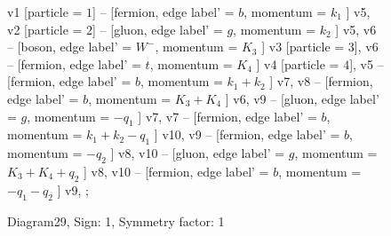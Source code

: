 \documentclass{revtex4}
\begin{document}
\begin{figure}[!htb]
\begin{center}
{    %
v1 [particle = \(1\)] -- [fermion, edge label' = \(b\), momentum = \(k_{1}\) ] v5, 
v2 [particle = \(2\)] -- [gluon, edge label' = \(g\), momentum = \(k_{2}\) ] v5, 
v6 -- [boson, edge label' = \(W^{-}\), momentum = \(K_{3}\) ] v3 [particle = \(3\)], 
v6 -- [fermion, edge label' = \(t\), momentum = \(K_{4}\) ] v4 [particle = \(4\)], 
v5 -- [fermion, edge label' = \(b\), momentum = \(k_{1} + k_{2}\) ] v7, 
v8 -- [fermion, edge label' = \(b\), momentum = \(K_{3} + K_{4}\) ] v6, 
v9 -- [gluon, edge label' = \(g\), momentum = \(-q_{1}\) ] v7, 
v7 -- [fermion, edge label' = \(b\), momentum = \(k_{1} + k_{2} - q_{1}\) ] v10, 
v9 -- [fermion, edge label' = \(b\), momentum = \(-q_{2}\) ] v8, 
v10 -- [gluon, edge label' = \(g\), momentum = \(K_{3} + K_{4} + q_{2}\) ] v8, 
v10 -- [fermion, edge label' = \(b\), momentum = \(-q_{1} - q_{2}\) ] v9, 
};
\end{center}
\caption{Diagram29, Sign: 1, Symmetry factor: 1}
\end{figure}
\newpage
\end{document}
